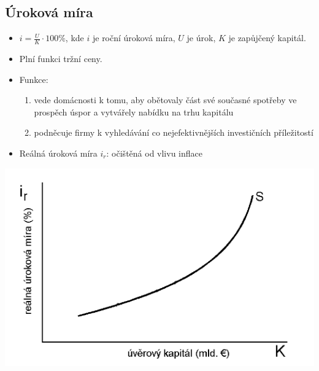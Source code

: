 \subsection{Úroková míra}
\begin{itemize}
    \item $i=\frac{U}{K}\cdot 100 \%$, kde $i$ je roční úroková míra, $U$ je úrok, $K$ je zapůjčený kapitál.
    \item Plní funkci tržní ceny.
    \item Funkce:
    \begin{enumerate}
        \item vede domácnosti k tomu, aby obětovaly část své současné spotřeby ve prospěch
        úspor a vytvářely nabídku na trhu kapitálu
        \item podněcuje firmy k vyhledávání co nejefektivnějších investičních příležitostí
    \end{enumerate}
    \item Reálná úroková míra $i_r$: očištěná od vlivu inflace
\end{itemize}
\includegraphics[width=16cm]{images/18_real_urok_m.png}